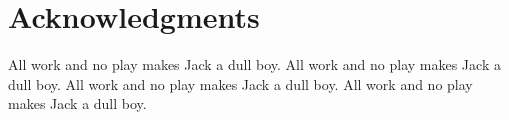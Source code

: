 
%
%

%
%

\section*{Acknowledgments}
\label{sec:acknowledgments}

All work and no play makes Jack a dull boy.
All work and no play makes Jack a dull boy.
All work and no play makes Jack a dull boy.
All work and no play makes Jack a dull boy.
